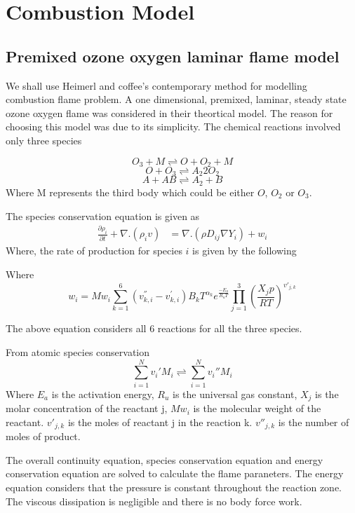 \chapter{Combustion Model}
\section{Premixed ozone oxygen laminar flame model}
We shall use Heimerl and coffee's contemporary method for modelling combustion flame problem. A one dimensional, premixed, laminar, steady state ozone oxygen flame was considered in their theortical model. The reason for choosing this model was due to its simplicity. The chemical reactions involved only three species 


			$$O_3 + M \rightleftharpoons O + O_2 + M $$
			$$ O + O_3 \rightleftharpoons A_2  2O_2$$ 
			$$A + AB \rightleftharpoons A_2 + B$$
\noindent Where M represents the third body which could be either $O$, $O_2$ or $O_3$. 

\noindent The species conservation equation is given as 
\begin{eqnarray}
	\frac{\partial \rho_i}{\partial t} + \nabla . (\rho_i v) &= \nabla . (\rho D_{ij} \nabla Y_i) + w_i
\end{eqnarray}
\noindent Where, the rate of production for species $i$ is given by the following 
	
Where $$w_i = Mw_i \sum_{k=1}^{6}(v_{k,i}^{''} - v_{k,i}^{'}) B_k T^{\alpha_k} e^{\frac{-E_a}{R_u T}} \prod_{j=1}^3 \left(\frac{X_j p}{R T} \right)^{v'_{j,k}}$$

\noindent The above equation considers all 6 reactions for all the three species. 

\noindent From atomic species conservation 
	$$\sum_{i=1}^{N} v_i{'}M_i \rightleftharpoons \sum_{i=1}^{N} v_i{''}M_i $$
\noindent Where $E_a$ is the activation energy, $R_u$ is the universal gas constant, $X_j$ is the molar concentration of the reactant j, $Mw_i$ is the molecular weight of the reactant. $v'_{j,k}$ is the moles of reactant j in the reaction k. $v''_{j,k}$ is the number of moles of product. 

\bigskip

\noindent The overall continuity equation, species conservation equation and energy conservation equation are solved to calculate the flame paraneters. The energy equation considers that the pressure is constant throughout the reaction zone. The viscous dissipation is negligible and there is no body force work. 

